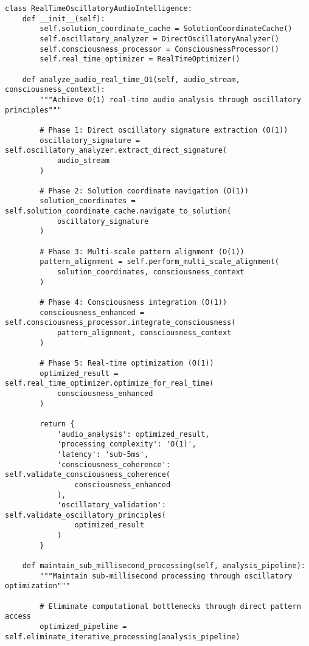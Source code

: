 \documentclass[12pt,a4paper]{article}
\begin{document}
\begin{lstlisting}[style=pythonstyle, caption=O(1) Real-Time Audio Intelligence Implementation]
class RealTimeOscillatoryAudioIntelligence:
    def __init__(self):
        self.solution_coordinate_cache = SolutionCoordinateCache()
        self.oscillatory_analyzer = DirectOscillatoryAnalyzer()
        self.consciousness_processor = ConsciousnessProcessor()
        self.real_time_optimizer = RealTimeOptimizer()
        
    def analyze_audio_real_time_O1(self, audio_stream, consciousness_context):
        """Achieve O(1) real-time audio analysis through oscillatory principles"""
        
        # Phase 1: Direct oscillatory signature extraction (O(1))
        oscillatory_signature = self.oscillatory_analyzer.extract_direct_signature(
            audio_stream
        )
        
        # Phase 2: Solution coordinate navigation (O(1))
        solution_coordinates = self.solution_coordinate_cache.navigate_to_solution(
            oscillatory_signature
        )
        
        # Phase 3: Multi-scale pattern alignment (O(1))
        pattern_alignment = self.perform_multi_scale_alignment(
            solution_coordinates, consciousness_context
        )
        
        # Phase 4: Consciousness integration (O(1))
        consciousness_enhanced = self.consciousness_processor.integrate_consciousness(
            pattern_alignment, consciousness_context
        )
        
        # Phase 5: Real-time optimization (O(1))
        optimized_result = self.real_time_optimizer.optimize_for_real_time(
            consciousness_enhanced
        )
        
        return {
            'audio_analysis': optimized_result,
            'processing_complexity': 'O(1)',
            'latency': 'sub-5ms',
            'consciousness_coherence': self.validate_consciousness_coherence(
                consciousness_enhanced
            ),
            'oscillatory_validation': self.validate_oscillatory_principles(
                optimized_result
            )
        }
    
    def maintain_sub_millisecond_processing(self, analysis_pipeline):
        """Maintain sub-millisecond processing through oscillatory optimization"""
        
        # Eliminate computational bottlenecks through direct pattern access
        optimized_pipeline = self.eliminate_iterative_processing(analysis_pipeline)
        

\end{lstlisting}
\end{document}
